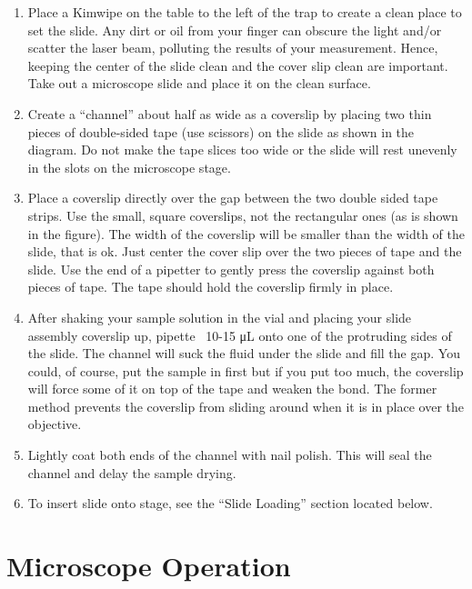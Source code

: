 \documentclass{../lab}
\begin{document}
\begin{enumerate}
    \item Place a Kimwipe on the table to the left of the trap to create a clean place to set the slide. Any dirt or oil from your finger can obscure the light and/or scatter the laser beam, polluting the results of your measurement. Hence, keeping the center of the slide clean and the cover slip clean are important. Take out a microscope slide and place it on the clean surface.

    \item Create a ``channel'' about half as wide as a coverslip by placing two thin pieces of double-sided tape (use scissors) on the slide as shown in the diagram. Do not make the tape slices too wide or the slide will rest unevenly in the slots on the microscope stage.

    \item Place a coverslip directly over the gap between the two double sided tape strips. Use the small, square coverslips, not the rectangular ones (as is shown in the figure). The width of the coverslip will be smaller than the width of the slide, that is ok. Just center the cover slip over the two pieces of tape and the slide. Use the end of a pipetter to gently press the coverslip against both pieces of tape. The tape should hold the coverslip firmly in place.

    \item After shaking your sample solution in the vial and placing your slide assembly coverslip up, pipette ~10-15 μL onto one of the protruding sides of the slide. The channel will suck the fluid under the slide and fill the gap. You could, of course, put the sample in first but if you put too much, the coverslip will force some of it on top of the tape and weaken the bond. The former method prevents the coverslip from sliding around when it is in place over the objective.

    \item Lightly coat both ends of the channel with nail polish. This will seal the channel and delay the sample drying.

    \item To insert slide onto stage, see the ``Slide Loading'' section located below.

\end{enumerate}

\section{Microscope Operation}
\end{document}
